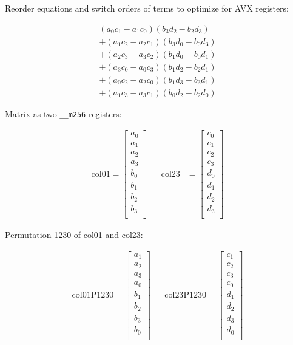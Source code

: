 \documentclass[]{scrartcl}
\newcommand{\pth}[1]{\left(#1\right)}
\begin{document}
Reorder equations and switch orders of terms to optimize for AVX registers:

\begin{align}
  \pth{a_0c_1 - a_1c_0} \pth{b_3d_2 - b_2d_3} \nonumber\\
+ \pth{a_1c_2 - a_2c_1} \pth{b_3d_0 - b_0d_3} \nonumber\\ 
+ \pth{a_2c_3 - a_3c_2} \pth{b_1d_0 - b_0d_1} \nonumber\\
+ \pth{a_3c_0 - a_0c_3} \pth{b_1d_2 - b_2d_1} \nonumber\\
+ \pth{a_0c_2 - a_2c_0} \pth{b_1d_3 - b_3d_1} \nonumber\\
+ \pth{a_1c_3 - a_3c_1} \pth{b_0d_2 - b_2d_0} 
\end{align}


Matrix as two \texttt{__m256} registers:

\begin{align*}
\mathrm{col01} 
=
\begin{bmatrix}
a_0\\
a_1\\
a_2\\
a_3\\
b_0\\
b_1\\
b_2\\
b_3\\
\end{bmatrix}
&&
\mathrm{col23} 
&=
\begin{bmatrix}
c_0\\
c_1\\
c_2\\
c_3\\
d_0\\
d_1\\
d_2\\
d_3\\
\end{bmatrix}
\end{align*}

Permutation 1230 of col01 and col23:

\begin{align*}
\mathrm{col01P1230} 
=
\begin{bmatrix}
a_1\\
a_2\\
a_3\\
a_0\\
b_1\\
b_2\\
b_3\\
b_0\\
\end{bmatrix}
&&
\mathrm{col23P1230} 
=
\begin{bmatrix}
c_1\\
c_2\\
c_3\\
c_0\\
d_1\\
d_2\\
d_3\\
d_0\\
\end{bmatrix}
\end{align*}
\end{document}
